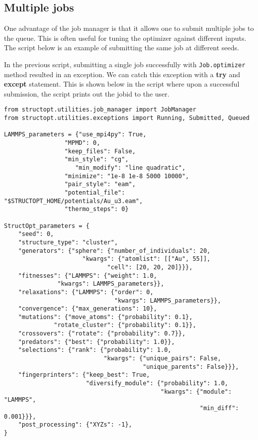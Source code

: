 \documentclass[11pt]{article}
\begin{document}
\subsection{Multiple jobs}
\label{sec-submit-multiple}
One advantage of the job manager is that it allows one to submit multiple jobs to the queue. This is often useful for tuning the optimizer against different inputs. The script below is an example of submitting the same job at different seeds.

In the previous script, submitting a single job successfully with \texttt{Job.optimizer} method resulted in an exception. We can catch this exception with a \textbf{try} and \textbf{except} statement. This is shown below in the script where upon a successful submission, the script prints out the jobid to the user.

\begin{verbatim}
from structopt.utilities.job_manager import JobManager
from structopt.utilities.exceptions import Running, Submitted, Queued

LAMMPS_parameters = {"use_mpi4py": True,
	             "MPMD": 0,
	             "keep_files": False,
	             "min_style": "cg",
                    "min_modify": "line quadratic",
	             "minimize": "1e-8 1e-8 5000 10000",
	             "pair_style": "eam",
	             "potential_file": "$STRUCTOPT_HOME/potentials/Au_u3.eam",
	             "thermo_steps": 0}

StructOpt_parameters = {
    "seed": 0,
    "structure_type": "cluster",
    "generators": {"sphere": {"number_of_individuals": 20,
		              "kwargs": {"atomlist": [["Au", 55]],
			                 "cell": [20, 20, 20]}}},
    "fitnesses": {"LAMMPS": {"weight": 1.0,
	           "kwargs": LAMMPS_parameters}},
    "relaxations": {"LAMMPS": {"order": 0,
                               "kwargs": LAMMPS_parameters}},
    "convergence": {"max_generations": 10},
    "mutations": {"move_atoms": {"probability": 0.1},
	          "rotate_cluster": {"probability": 0.1}},
    "crossovers": {"rotate": {"probability": 0.7}},
    "predators": {"best": {"probability": 1.0}},
    "selections": {"rank": {"probability": 1.0,
                            "kwargs": {"unique_pairs": False,
                                       "unique_parents": False}}},
    "fingerprinters": {"keep_best": True,
                       "diversify_module": {"probability": 1.0,
                                            "kwargs": {"module": "LAMMPS",
                                                       "min_diff": 0.001}}},
    "post_processing": {"XYZs": -1},
}


\end{verbatim}
\end{document}
